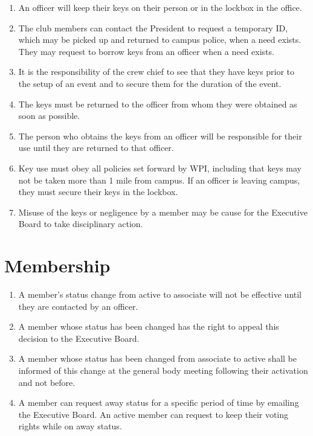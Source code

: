 \documentclass[12pt,letterpaper,oneside]{book}
\begin{document}
\begin{enumerate}

\item An officer will keep their keys on their person or in the lockbox in the office.
\item The club members can contact the President to request a temporary ID, which may be picked up and returned to campus police, when a need exists. They may request to borrow keys from an officer when a need exists.
\item It is the responsibility of the crew chief to see that they have keys prior to the setup of an event and to secure them for the duration of the event.
\item The keys must be returned to the officer from whom they were obtained as soon as possible.
\item The person who obtains the keys from an officer will be responsible for their use until they are returned to that officer.
\item Key use must obey all policies set forward by WPI, including that keys may not be taken more than 1 mile from campus. If an officer is leaving campus, they must secure their keys in the lockbox.
\item Misuse of the keys or negligence by a member may be cause for the Executive Board to take disciplinary action.

\end{enumerate}

\section{Membership}

\begin{enumerate}

\item A member's status change from active to associate will not be effective until they are contacted by an officer.
\item A member whose status has been changed has the right to appeal this decision to the Executive Board.
\item A member whose status has been changed from associate to active shall be informed of this change at the general body meeting following their activation and not before.
\item A member can request away status for a specific period of time by emailing the Executive Board.  An active member can request to keep their voting rights while on away status.

\end{enumerate}
\end{document}
